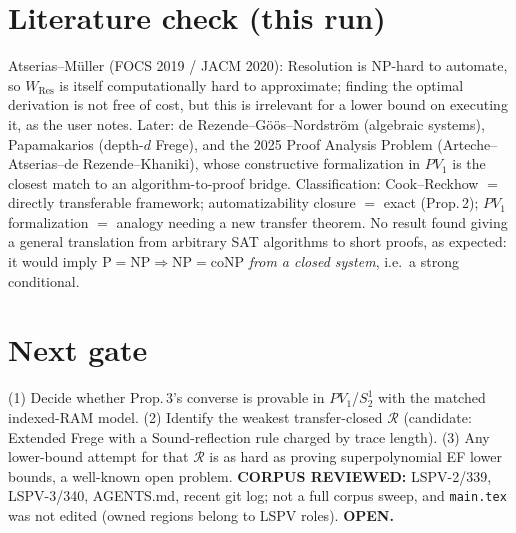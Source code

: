 \documentclass[11pt]{article}
\begin{document}
\section{Literature check (this run)}
Atserias--M\"uller (FOCS 2019 / JACM 2020): Resolution is NP-hard to automate, so $W_{\mathrm{Res}}$ is itself computationally hard to approximate; finding the optimal derivation is not free of cost, but this is irrelevant for a lower bound on executing it, as the user notes. Later: de Rezende--G\"o\"os--Nordstr\"om (algebraic systems), Papamakarios (depth-$d$ Frege), and the 2025 Proof Analysis Problem (Arteche--Atserias--de Rezende--Khaniki), whose constructive formalization in $PV_1$ is the closest match to an algorithm-to-proof bridge. Classification: Cook--Reckhow $=$ directly transferable framework; automatizability closure $=$ exact (Prop.\,2); $PV_1$ formalization $=$ analogy needing a new transfer theorem. No result found giving a general translation from arbitrary SAT algorithms to short proofs, as expected: it would imply $\mathrm P=\mathrm{NP}\Rightarrow\mathrm{NP}=\mathrm{coNP}$ \emph{from a closed system}, i.e.\ a strong conditional.

\section{Next gate}
(1) Decide whether Prop.\,3's converse is provable in $PV_1$/$S^1_2$ with the matched indexed-RAM model. (2) Identify the weakest transfer-closed $\mathcal R$ (candidate: Extended Frege with a $\mathrm{Sound}$-reflection rule charged by trace length). (3) Any lower-bound attempt for that $\mathcal R$ is as hard as proving superpolynomial EF lower bounds, a well-known open problem. \textbf{CORPUS REVIEWED:} LSPV-2/339, LSPV-3/340, AGENTS.md, recent git log; not a full corpus sweep, and \texttt{main.tex} was not edited (owned regions belong to LSPV roles). \textbf{OPEN.}
\end{document}
